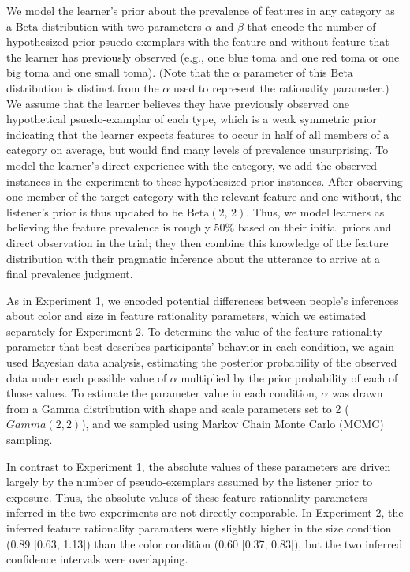 \documentclass[
  english,
  man,floatsintext]{apa6}
\begin{document}
We model the learner's prior about the prevalence of features in any category as a \(\text{Beta}\) distribution with two parameters \(\alpha\) and \(\beta\) that encode the number of hypothesized prior psuedo-exemplars with the feature and without feature that the learner has previously observed (e.g., one blue toma and one red toma or one big toma and one small toma). (Note that the \(\alpha\) parameter of this \(\text{Beta}\) distribution is distinct from the \(\alpha\) used to represent the rationality parameter.) We assume that the learner believes they have previously observed one hypothetical psuedo-examplar of each type, which is a weak symmetric prior indicating that the learner expects features to occur in half of all members of a category on average, but would find many levels of prevalence unsurprising. To model the learner's direct experience with the category, we add the observed instances in the experiment to these hypothesized prior instances. After observing one member of the target category with the relevant feature and one without, the listener's prior is thus updated to be \(\text{Beta}\left(2,\,2\right)\). Thus, we model learners as believing the feature prevalence is roughly 50\% based on their initial priors and direct observation in the trial; they then combine this knowledge of the feature distribution with their pragmatic inference about the utterance to arrive at a final prevalence judgment.

As in Experiment 1, we encoded potential differences between people's inferences about color and size in feature rationality parameters, which we estimated separately for Experiment 2. To determine the value of the feature rationality parameter that best describes participants' behavior in each condition, we again used Bayesian data analysis, estimating the posterior probability of the observed data under each possible value of \(\alpha\) multiplied by the prior probability of each of those values. To estimate the parameter value in each condition, \(\alpha\) was drawn from a Gamma distribution with shape and scale parameters set to 2 (\(Gamma\left(2,2\right)\)), and we sampled using Markov Chain Monte Carlo (MCMC) sampling.

In contrast to Experiment 1, the absolute values of these parameters are driven largely by the number of pseudo-exemplars assumed by the listener prior to exposure. Thus, the absolute values of these feature rationality parameters inferred in the two experiments are not directly comparable. In Experiment 2, the inferred feature rationality paramaters were slightly higher in the size condition (0.89 {[}0.63, 1.13{]}) than the color condition (0.60 {[}0.37, 0.83{]}), but the two inferred confidence intervals were overlapping.
\end{document}
